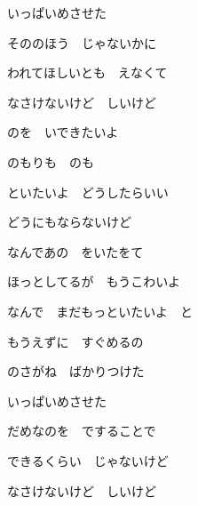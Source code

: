 \documentclass[a4paper,tate,twocolumn,12pt]{ltjtarticle}
\begin{document}
\begin{flushleft}
\begin{minipage}{\linewidth}
いっぱいめさせた

そののほう　じゃないかに

われてほしいとも　えなくて
\end{minipage}

\vspace{2em}

\noindent\begin{minipage}{\linewidth}
なさけないけど　しいけど

のを　いできたいよ

のもりも　のも

といたいよ　どうしたらいい

どうにもならないけど
\end{minipage}

\vspace{2em}

\noindent\begin{minipage}{\linewidth}
なんであの　をいたをて

ほっとしてるが　もうこわいよ

なんで　まだもっといたいよ　と

もうえずに　すぐめるの
\end{minipage}

\vspace{2em}

\noindent\begin{minipage}{\linewidth}
のさがね　ばかりつけた

いっぱいめさせた

だめなのを　ですることで

できるくらい　じゃないけど
\end{minipage}

\vspace{2em}

\noindent\begin{minipage}{\linewidth}
なさけないけど　しいけど


\end{minipage}
\end{flushleft}
\end{document}
